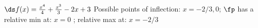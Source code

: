 {$\ds f(x) = \frac{x^4}{4}+\frac{x^3}{3}-2 x+3$
}
{Possible points of inflection: $x=-2/3,0$;
$\fp$ has a relative min at: $x=0$ ;
relative max at: $x=-2/3$}
